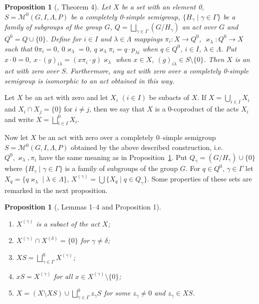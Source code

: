 \documentclass{birkau}
\numberwithin{equation}{section}
\theoremstyle{plain}
\newtheorem{proposition}[theorem]{Proposition}
\theoremstyle{definition}
\begin{document}
	\begin{proposition}[\cite{avdeev}, Theorem 4] \label{pr02}
	    Let $X$ be a set with an element 0, $S=\mathcal{M}^0(G,I,\Lambda,P)$ be a completely 0-simple semigroup, $\{ H_\gamma \mid \gamma \in \Gamma \}$ be a family of subgroups of the group $G$, $ Q = \bigsqcup_{\gamma \in \Gamma} (G/H_\gamma) $ an act over $G$ and $Q^0 = Q \cup \{0\}$. Define for $i \in I$ and $\lambda \in \Lambda$ mappings $\pi_i:X \rightarrow Q^0$, $\varkappa_\lambda: Q^0 \rightarrow X$ such that $0\pi_i = 0$, $0\varkappa_\lambda = 0$, $q \varkappa_\lambda \pi_i = q \cdot p_{\lambda i}$ when $ q \in Q^0$, $i \in I$, $\lambda \in \Lambda$. Put $x \cdot 0 = 0$, $x \cdot (g)_{i \lambda} = (x \pi_i \cdot g)\varkappa_{\lambda}$ when $x \in X$, $(g)_{i \lambda} \in S \setminus \{0\}$. Then $X$ is an act with zero over $S$. Furthermore, any act with zero over a completely 0-simple semigroup is isomorphic to an act obtained in this way.
	\end{proposition}
	
	Let $X$ be an act with zero and let $X_i$ $(i \in I)$ be subacts of $X$. If $X = \bigcup_{i \in I} X_i$ and $X_i \cap X_j = \{0\}$ for $i \neq j$, then we say that $X$ is a 0-coproduct of the acts $X_i$ and write $X = \bigsqcup_{i \in I}^0 X_i$.
	
	Now let $X$ be an act with zero over a completely 0--simple semigroup $S=\mathcal{M}^0(G,I,\Lambda,P)$ obtained by the above described construction, i.e. $Q^0,\varkappa_\lambda,\pi_i$ have the same meaning as in Proposition~\ref{pr02}. Put $Q_\gamma = (G/H_\gamma) \cup \{0\}$ where $\{ H_\gamma \mid \gamma \in \Gamma \}$ is a family of subgroups of the group $G$. For $q \in Q^0$, $\gamma \in \Gamma$ let $X_q = \{q\varkappa_\lambda \mid \lambda \in \Lambda \}$, $X^{(\gamma)} = \bigcup\{X_q \mid q \in Q_{\gamma}\}$. Some properties of these sets are remarked in the next proposition.
	
	\begin{proposition}[\cite{avdeev}, Lemmas 1--4 and Proposition 1] \label{pr03}
		\
		\begin{enumerate}
			\item[(1)] $X^{(\gamma)}$ is a subact of the act $X$;
			\item[(2)] $X^{(\gamma)} \cap X^{(\delta)} = \{0\}$ for $\gamma \neq \delta$;
			\item[(3)] $XS = \bigsqcup_{\gamma \in \Gamma}^0 X^{(\gamma)}$;
			\item[(4)] $xS = X^{(\gamma)}$ for all $x \in X^{(\gamma)} \setminus \{0\}$;
			\item[(5)] $X = (X \setminus XS) \cup \bigsqcup_{\gamma \in \Gamma}^0 z_{\gamma} S $ for some $z_\gamma \neq 0$ and $z_\gamma \in XS$.
		\end{enumerate}
	\end{proposition}
	
\end{document}
